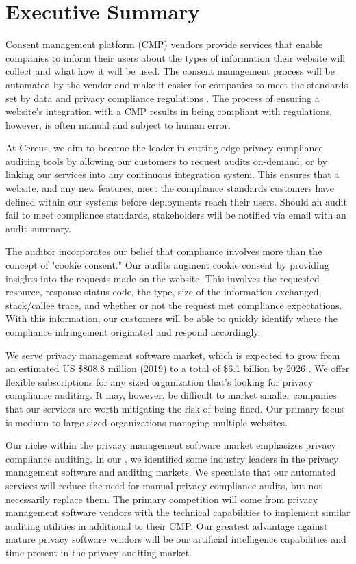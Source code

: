 {\let\cleardoublepage\relax \chapter*{Executive Summary}}

Consent management platform (CMP) vendors provide services that enable companies to inform their users about the types of information their website will collect and what how it will be used. The consent management process will be automated by the vendor and make it easier for companies to meet the standards set by data and privacy compliance regulations \cite{cmp.what.2020}. The process of ensuring a website's integration with a CMP results in being compliant with regulations, however, is often manual and subject to human error.

At Cereus, we aim to become the leader in cutting-edge privacy compliance auditing tools by allowing our customers to request audits on-demand, or by linking our services into any continuous integration system. This ensures that a website, and any new features, meet the compliance standards customers have defined within our systems before deployments reach their users. Should an audit fail to meet compliance standards, stakeholders will be notified via email with an audit summary.

The auditor incorporates our belief that compliance involves more than the concept of "cookie consent." Our audits augment cookie consent by providing insights into the requests made on the website. This involves the requested resource, response status code, the type, size of the information exchanged, stack/callee trace, and whether or not the request met compliance expectations. With this information, our customers will be able to quickly identify where the compliance infringement originated and respond accordingly.

We serve privacy management software market, which is expected to grow from an estimated US \$808.8 million (2019) to a total of \$6.1 billion by 2026 \cite{qy.2020}. We offer flexible subscriptions for any sized organization that's looking for privacy compliance auditing. It may, however, be difficult to market smaller companies that our services are worth mitigating the risk of being fined. Our primary focus is medium to large sized organizations managing multiple websites. 

Our niche within the privacy management software market emphasizes privacy compliance auditing. In our , we identified some industry leaders in the privacy management software and auditing markets. We speculate that our automated services will reduce the need for manual privacy compliance audits, but not necessarily replace them. The primary competition will come from privacy management software vendors with the technical capabilities to implement similar auditing utilities in additional to their CMP. Our greatest advantage against mature privacy software vendors will be our artificial intelligence capabilities and time present in the privacy auditing market.

